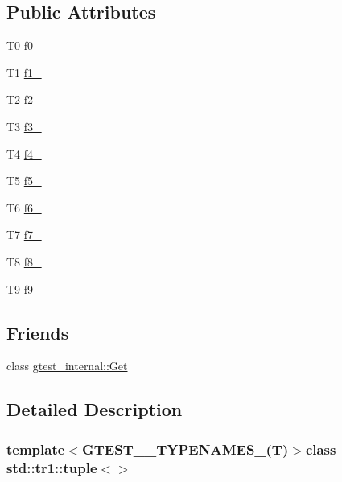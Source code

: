\subsection*{\-Public \-Attributes}
\begin{DoxyCompactItemize}
\item 
\-T0 \hyperlink{classstd_1_1tr1_1_1tuple_a47c8da1ffce21e1ef1ed7ab0a52d5e59}{f0\-\_\-}
\item 
\-T1 \hyperlink{classstd_1_1tr1_1_1tuple_a231ac57e5dc4335e379df57e0824b7dd}{f1\-\_\-}
\item 
\-T2 \hyperlink{classstd_1_1tr1_1_1tuple_aa127058e0f6093d8d1cad10d8aa4e713}{f2\-\_\-}
\item 
\-T3 \hyperlink{classstd_1_1tr1_1_1tuple_a4c07c01e90d50a2a6678e9c8c820bdf4}{f3\-\_\-}
\item 
\-T4 \hyperlink{classstd_1_1tr1_1_1tuple_aa5e925e415c418cb0517dcdca3f403ad}{f4\-\_\-}
\item 
\-T5 \hyperlink{classstd_1_1tr1_1_1tuple_a958de1bea4fa35ad0859360efa2bd9fb}{f5\-\_\-}
\item 
\-T6 \hyperlink{classstd_1_1tr1_1_1tuple_a597448bec664cd26fd4418b3b53fa339}{f6\-\_\-}
\item 
\-T7 \hyperlink{classstd_1_1tr1_1_1tuple_adad604e2e34188f7ede1195892853834}{f7\-\_\-}
\item 
\-T8 \hyperlink{classstd_1_1tr1_1_1tuple_a4adb86b35d375c2a181eec5b01ad7c39}{f8\-\_\-}
\item 
\-T9 \hyperlink{classstd_1_1tr1_1_1tuple_a0aa6a1fc824cbe3463a2c6d99415ca6c}{f9\-\_\-}
\end{DoxyCompactItemize}
\subsection*{\-Friends}
\begin{DoxyCompactItemize}
\item 
class \hyperlink{classstd_1_1tr1_1_1tuple_a8baf0c85256b4370382c7129e48e9875}{gtest\-\_\-internal\-::\-Get}
\end{DoxyCompactItemize}


\subsection{\-Detailed \-Description}
\subsubsection*{template$<$\-G\-T\-E\-S\-T\-\_\-\_\-\-T\-Y\-P\-E\-N\-A\-M\-E\-S\-\_\-(\-T)$>$class std\-::tr1\-::tuple$<$$>$}



